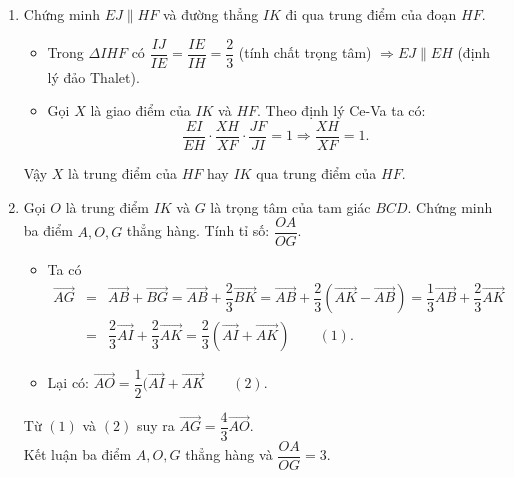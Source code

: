 \begin{bt}
\begin{bt}
{\begin{enumerate}
\begin{itemize}
				$\heva{& H \in IE \subset (ABC) \\ &H \in JK \subset(ACD)} \Rightarrow H \in(ABC) \cap (ACD)$.\\
				Hay $H$ thuộc giao tuyến $AC$ của mặt phẳng $(ABC)$ với mặt phẳng $(ACD)$.
			\end{itemize}
			Kết luận 3 đường thẳng $AC, JK$ và $IE$ đồng quy tại điểm $H$.
			\begin{itemize}
				\item Trong mặt phẳng $(ABC)$, dựng $EN  \parallel  AB, N \in AC$.
				\item Trong $\Delta ABC$ có $\dfrac{ CE}{CB}=\dfrac{EN}{AB}=\dfrac{1}{3} \Rightarrow \dfrac{EN}{AI}=\dfrac{2}{3}$.
				\item Trong $\Delta HAI$ có $\dfrac{ HE }{HI}=\dfrac{EN}{AI}=\dfrac{2}{3} \Rightarrow E$ là trọng tâm của $\Delta ABH$.
			\end{itemize}
			Vậy $\dfrac{HC}{HA}=\dfrac{1}{2}$.
			\item Chứng minh $EJ  \parallel  HF$ và đường thẳng $IK$ đi qua trung điểm của đoạn $HF$.\\
			\begin{itemize}
				\item Trong $\Delta IHF$ có $\dfrac{IJ}{IE}=\dfrac{IE}{IH}=\dfrac{2}{3}$ (tính chất trọng tâm) $\Rightarrow {EJ}  \parallel  EH$ (định lý đảo Thalet).
				\item Gọi $X$ là giao điểm của $IK$ và $HF$. Theo định lý Ce-Va ta có:\\
				$$\dfrac{EI}{EH} \cdot \dfrac{XH}{XF} \cdot \dfrac{JF}{JI}=1 \Rightarrow \dfrac{XH}{XF} =1.$$
			\end{itemize}
			Vậy $X$ là trung điểm của $HF$ hay $IK$ qua trung điểm của $HF$. 
			\item Gọi $O$ là trung điểm $IK$ và $G$ là trọng tâm của tam giác $BCD$. Chứng minh ba điểm $A, O, G$ thẳng hàng. Tính tỉ số: $\dfrac{OA}{OG}$.
			\begin{itemize}
				\item Ta có
				\begin{eqnarray*}
					\overrightarrow{AG} & =& \overrightarrow{AB}+\overrightarrow{BG}=\overrightarrow{AB}+\dfrac{2}{3} \overrightarrow{BK}=\overrightarrow{AB}+\dfrac{2}{3}(\overrightarrow{AK}-\overrightarrow{AB})=\dfrac{1}{3} \overrightarrow{AB}+\dfrac{2}{3} \overrightarrow{AK} \\
					&=& \dfrac{2}{3} \overrightarrow{AI}+\dfrac{2}{3} \overrightarrow{AK}=\dfrac{2}{3} \left(\overrightarrow{AI}+\overrightarrow{AK}\right) \quad \quad (1) .
				\end{eqnarray*}
				\item Lại có: $\overrightarrow{AO}=\dfrac{1}{2}(\overrightarrow{AI}+\overrightarrow{AK} \quad \quad (2)$.
			\end{itemize}
			Từ $(1)$ và $(2)$ suy ra $\overrightarrow{AG}=\dfrac{4}{3} \overrightarrow{AO}$.\\
			Kết luận ba điểm $A, O, G$ thẳng hàng và $\dfrac{OA}{OG}=3$.
		\end{enumerate}
		
}
\end{bt}
\end{bt}

